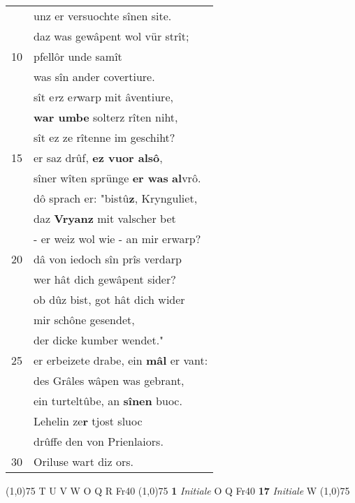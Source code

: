 \documentclass[8pt,a4paper,notitlepage]{article}
\begin{document}
\begin{table}[ht]
\begin{minipage}[t]{0.5\linewidth}
\begin{tabular}{rl}
 & unz er versuochte sînen site.\\ 
 & daz was gewâpent wol vür strît;\\ 
10 & pfellôr unde samît\\ 
 & was sîn ander covertiure.\\ 
 & sît e\textit{r}z e\textit{r}warp mit âventiure,\\ 
 & \textbf{war umbe} solterz rîten niht,\\ 
 & sît ez ze rîtenne im geschiht?\\ 
15 & er saz drûf, \textbf{ez vuor alsô},\\ 
 & sîner wîten sprünge \textbf{er was} \textbf{al}vrô.\\ 
 & dô sprach er: "bistû\textbf{z}, Krynguliet,\\ 
 & daz \textbf{Vryanz} mit valscher bet\\ 
 & - er weiz wol wie - an mir erwarp?\\ 
20 & dâ von iedoch sîn prîs verdarp\\ 
 & wer hât dich gewâpent sider?\\ 
 & ob dûz bist, got hât dich wider\\ 
 & mir schône gesendet,\\ 
 & der dicke kumber wendet."\\ 
25 & er erbeizete drabe, ein \textbf{mâl} er vant:\\ 
 & des Grâles wâpen was gebrant,\\ 
 & ein turteltûbe, an \textbf{sînen} buoc.\\ 
 & Lehelin ze\textbf{r} tjost sluoc\\ 
 & drûffe den von Prienlaiors.\\ 
30 & Oriluse wart diz ors.\\ 
\end{tabular}
\scriptsize
\line(1,0){75} \newline
T U V W O Q R Fr40 \newline
\line(1,0){75} \newline
\textbf{1} \textit{Initiale} O Q Fr40  \textbf{17} \textit{Initiale} W  \newline
\line(1,0){75} \newline

\end{minipage}
\end{table}
\end{document}
